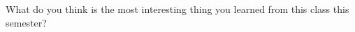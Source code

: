 \documentclass[12pt, leqno]{article}
\begin{document}

What do you think is the most interesting thing you learned from this
class this semester?
\end{document}
